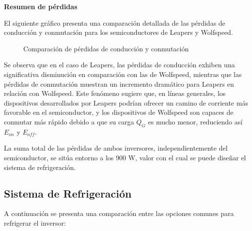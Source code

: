 \textbf{Resumen de pérdidas}

El siguiente gráfico presenta una comparación detallada de las pérdidas de conducción y conmutación para los semiconductores de Leapers y Wolfspeed.

\begin{figure}[H]
	\centering
	\caption{Comparación de pérdidas de conducción y conmutación}
	\label{fig:loss_comparison}
\end{figure}

Se observa que en el caso de Leapers, las pérdidas de conducción exhiben una significativa disminución en comparación con las de Wolfspeed, mientras que las pérdidas de conmutación muestran un incremento dramático para Leapers en relación con Wolfspeed. Este fenómeno sugiere que, en líneas generales, los dispositivos desarrollados por Leapers podrían ofrecer un camino de corriente más favorable en el semiconductor, y los dispositivos de Wolfspeed son capaces de conmutar más rápido debido a que su carga $Q_G$ es mucho menor, reduciendo así $E_{on}$ y $E_{off}$.

La suma total de las pérdidas de ambos inversores, independientemente del semiconductor, se sitúa entorno a los 900 W, valor con el cual se puede diseñar el sistema de refrigeración.

\subsection{Sistema de Refrigeración}

A continuación se presenta una comparación entre las opciones comunes para refrigerar el inversor:

